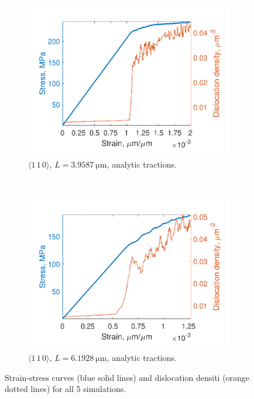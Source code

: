 \begin{figure}
    \begin{subfigure}[t]{0.45\linewidth}
        \centering
        \includegraphics[width=\linewidth]{../data/density_11-Mar-2021_4_tensile_ni_110.pdf}
        \caption{$\langle 1\, 1\, 0 \rangle$, $L = \SI{3.9587}{\micro\metre}$, analytic tractions.}
        \label{sf:stressDens4}
    \end{subfigure}
    ~
    \begin{subfigure}[t]{0.45\linewidth}
        \centering
        \includegraphics[width=\linewidth]{../data/density_16-Mar-2021_4_tensile_ni_110.pdf}
        \caption{$\langle 1\, 1\, 0 \rangle$, $L = \SI{6.1928}{\micro\metre}$, analytic tractions.}
        \label{sf:stressDens5}
    \end{subfigure}
    \caption{Strain-stress curves (blue solid lines) and dislocation densiti (orange dotted lines) for all 5 simulations.}
    \label{f:stressDens}
\end{figure}


